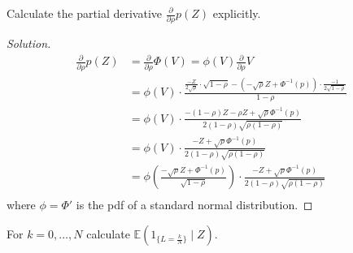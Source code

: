 \documentclass[10pt]{article}
\newcommand{\E}{\mathbb{E}}
\newenvironment{problem}[2][Problem]{\begin{trivlist}
\item[\hskip \labelsep {\bfseries #1}\hskip \labelsep {\bfseries #2.}]}{\end{trivlist}}
\begin{document}
\begin{problem}{4}
    Calculate the partial derivative $\frac{\partial}{\partial \rho} p(Z)$ explicitly.
\end{problem}

\begin{proof}[Solution]
    \begin{align*}
        \frac{\partial}{\partial \rho} p(Z) &= \frac{\partial}{\partial \rho} \Phi(V) = \phi(V) \frac{\partial}{\partial \rho} V \\
        &= \phi(V) \cdot \frac{\frac{-Z}{2 \sqrt{\rho}} \cdot \sqrt{1 - \rho} - (-\sqrt{\rho} Z + \Phi^{-1}(p)) \cdot \frac{-1}{2 \sqrt{1 - \rho}} }{1 - \rho} \\
        &= \phi(V) \cdot \frac{-(1 - \rho)Z - \rho Z + \sqrt{\rho}\Phi^{-1}(p)}{2 (1 - \rho) \sqrt{\rho (1 - \rho)}} \\
        &= \phi(V) \cdot \frac{-Z + \sqrt{\rho}\Phi^{-1}(p)}{2 (1 - \rho) \sqrt{\rho (1 - \rho)}} \\
        &= \phi \left( \frac{-\sqrt{\rho} Z + \Phi^{-1}(p)}{\sqrt{1 - \rho}} \right) \cdot \frac{-Z + \sqrt{\rho}\Phi^{-1}(p)}{2 (1 - \rho) \sqrt{\rho (1 - \rho)}} \\
    \end{align*}
    where $\phi = \Phi'$ is the pdf of a standard normal distribution.
\end{proof}



\begin{problem}{5}
    For $k = 0, \ldots, N$ calculate $\E \left( 1_{\{L = \frac{k}{N}\}} \mid Z \right)$.
\end{problem}
\end{document}
